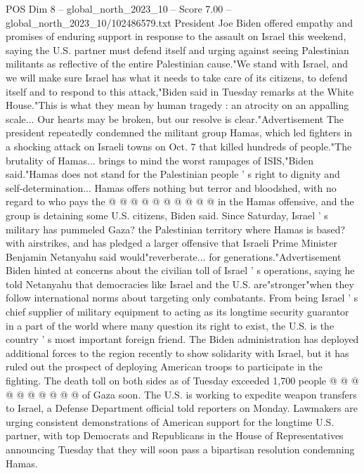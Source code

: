 \begin{textsample}{POS Dim 8 – global\_north\_2023\_10 – Score 7.00 – global\_north\_2023\_10/102486579.txt}  \label{ex:f8_pos_248}
President Joe Biden offered empathy and promises of enduring support in response to the assault on Israel this weekend, saying the U.S. partner must defend itself and urging against seeing Palestinian militants as reflective of the entire Palestinian cause."We stand with Israel, and we will make sure Israel has what it needs to take care of its citizens, to defend itself and to respond to this attack,"Biden said in Tuesday remarks at the White House."This is what they mean by human tragedy : an atrocity on an appalling scale...
Our hearts may be broken, but our resolve is clear."Advertisement The president repeatedly condemned the militant group Hamas, which led fighters in a shocking attack on Israeli towns on Oct. 7 that killed hundreds of people."The brutality of Hamas... brings to mind the worst rampages of ISIS,"Biden said."Hamas does not stand for the Palestinian people ' s right to dignity and self-determination...
Hamas offers nothing but terror and bloodshed, with no regard to who pays the @ @ @ @ @ @ @ @ @ @ in the Hamas offensive, and the group is detaining some U.S. citizens, Biden said.
Since Saturday, Israel ' s military has pummeled Gaza? the Palestinian territory where Hamas is based? with airstrikes, and has pledged a larger offensive that Israeli Prime Minister Benjamin Netanyahu said would"reverberate... for generations."Advertisement Biden hinted at concerns about the civilian toll of Israel ' s operations, saying he told Netanyahu that democracies like Israel and the U.S. are"stronger"when they follow international norms about targeting only combatants.
From being Israel ' s chief supplier of military equipment to acting as its longtime security guarantor in a part of the world where many question its right to exist, the U.S. is the country ' s most important foreign friend.
The Biden administration has deployed additional forces to the region recently to show solidarity with Israel, but it has ruled out the prospect of deploying American troops to participate in the fighting.
The death toll on both sides as of Tuesday exceeded 1,700 people @ @ @ @ @ @ @ @ @ @ of Gaza soon.
The U.S. is working to expedite weapon transfers to Israel, a Defense Department official told reporters on Monday.
Lawmakers are urging consistent demonstrations of American support for the longtime U.S. partner, with top Democrats and Republicans in the House of Representatives announcing Tuesday that they will soon pass a bipartisan resolution condemning Hamas.

\end{textsample}
